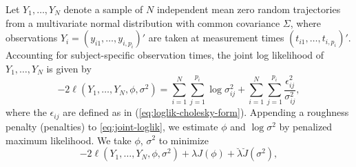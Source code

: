 \bigskip

Let  $Y_1, \dots, Y_N$ denote a sample of $N$ independent mean zero random trajectories from a  multivariate normal distribution with common covariance $\Sigma$, where observations $Y_i = \left(y_{i1}, \dots, y_{i,p_i}\right)'$ are taken at measurement times $\left(t_{i1}, \dots, t_{i,p_i}\right)'$. Accounting for subject-specific observation times, the joint log likelihood of $Y_1, \dots, Y_N$ is given by  
\begin{equation} \label{eq:joint-loglik}
-2\ell\left( Y_1,\dots, Y_N, \phi, \sigma^2 \right) = \sum_{i = 1}^N \sum_{j = 1}^{p_i} \log \sigma_{ij}^2  + \sum_{i = 1}^N \sum_{j = 1}^{p_i} \frac {\epsilon_{ij}^2}{\sigma_{ij}^2},
\end{equation}
\noindent
where the $\epsilon_{ij}$ are defined as in (\ref{eq:loglik-cholesky-form}). Appending a roughness penalty (penalties) to \ref{eq:joint-loglik}, we estimate $\phi$ and $\log\sigma^2$ by penalized maximum likelihood. We take $\phi$, $\sigma^2$ to minimize 
\begin{equation} \label{eq:penalized-joint-loglik}
-2\ell\left( Y_1,\dots, Y_N, \phi, \sigma^2 \right) +    \lambda J\left( \phi \right) +  \breve{\lambda}\breve{J}\left( \sigma^2 \right),
\end{equation}
\noindent
